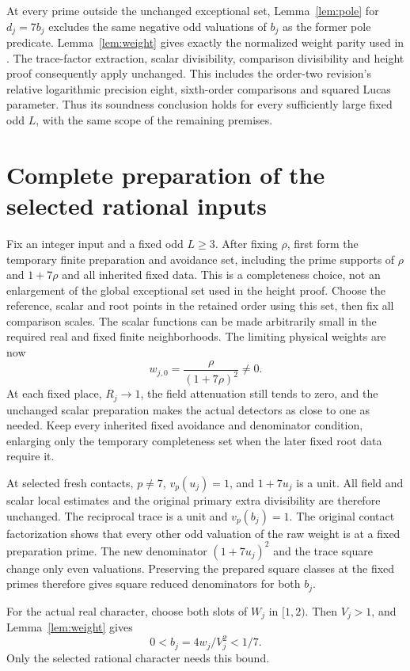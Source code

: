 \documentclass[11pt,a4paper]{article}
\begin{document}
At every prime outside the unchanged exceptional set, Lemma~\ref{lem:pole}
for \(d_j=7b_j\) excludes the same negative odd valuations of \(b_j\)
as the former pole predicate. Lemma~\ref{lem:weight} gives exactly
the normalized weight parity used in \cite{Reweighted,Precision}.
The trace-factor extraction, scalar divisibility, comparison
divisibility and height proof consequently apply unchanged.
This includes the order-two revision's relative logarithmic precision
eight, sixth-order comparisons and squared Lucas parameter.
Thus its soundness conclusion holds for every sufficiently large
fixed odd \(L\), with the same scope of the remaining premises.

\section{Complete preparation of the selected rational inputs}

Fix an integer input and a fixed odd \(L\ge3\).
After fixing \(\rho\), first form the temporary finite preparation
and avoidance set, including the prime supports of \(\rho\) and
\(1+7\rho\) and all inherited fixed data. This is a completeness
choice, not an enlargement of the global exceptional set used in
the height proof. Choose the reference, scalar and root points in
the retained order using this set, then fix all comparison scales.
The scalar functions can be made arbitrarily
small in the required real and fixed finite neighborhoods.
The limiting physical weights are now
\[
                 w_{j,0}=\frac{\rho}{(1+7\rho)^2}\ne0.
\]
At each fixed place, \(R_j\to1\), the field attenuation still tends
to zero, and the unchanged scalar preparation makes the actual
detectors as close to one as needed. Keep every inherited fixed
avoidance and denominator condition, enlarging only the temporary
completeness set when the later fixed root data require it.

At selected fresh contacts, \(p\ne7\), \(v_p(u_j)=1\), and
\(1+7u_j\) is a unit. All field and scalar local estimates and
the original primary extra divisibility are therefore unchanged.
The reciprocal trace is a unit and \(v_p(b_j)=1\).
The original contact factorization shows that every other odd
valuation of the raw weight is at a fixed preparation prime.
The new denominator \((1+7u_j)^2\) and the trace square change
only even valuations. Preserving the prepared square classes at
the fixed primes therefore gives square reduced denominators
for both \(b_j\).

For the actual real character, choose both slots of \(W_j\) in
\([1,2)\). Then \(V_j>1\), and Lemma~\ref{lem:weight} gives
\[
                    0<b_j=4w_j/V_j^2<1/7.
\]
Only the selected rational character needs this bound.
\end{document}

